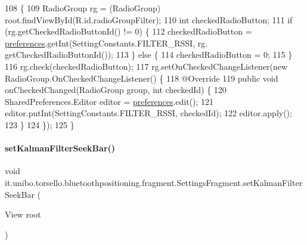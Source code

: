 \begin{DoxyCode}
108                                          \{
109         RadioGroup rg = (RadioGroup) root.findViewById(R.id.radioGroupFilter);
110         \textcolor{keywordtype}{int} checkedRadioButton;
111         \textcolor{keywordflow}{if} (rg.getCheckedRadioButtonId() != 0) \{
112             checkedRadioButton = \hyperlink{classit_1_1unibo_1_1torsello_1_1bluetoothpositioning_1_1fragment_1_1SettingsFragment_a52480c4d5d81ca59fe4a98ae3c623ea4_a52480c4d5d81ca59fe4a98ae3c623ea4}{preferences}.getInt(SettingConstants.FILTER\_RSSI, rg.
      getCheckedRadioButtonId());
113         \} \textcolor{keywordflow}{else} \{
114             checkedRadioButton = 0;
115         \}
116         rg.check(checkedRadioButton);
117         rg.setOnCheckedChangeListener(\textcolor{keyword}{new} RadioGroup.OnCheckedChangeListener() \{
118             @Override
119             \textcolor{keyword}{public} \textcolor{keywordtype}{void} onCheckedChanged(RadioGroup group, \textcolor{keywordtype}{int} checkedId) \{
120                 SharedPreferences.Editor editor = \hyperlink{classit_1_1unibo_1_1torsello_1_1bluetoothpositioning_1_1fragment_1_1SettingsFragment_a52480c4d5d81ca59fe4a98ae3c623ea4_a52480c4d5d81ca59fe4a98ae3c623ea4}{preferences}.edit();
121                 editor.putInt(SettingConstants.FILTER\_RSSI, checkedId);
122                 editor.apply();
123             \}
124         \});
125     \}
\end{DoxyCode}
\hypertarget{classit_1_1unibo_1_1torsello_1_1bluetoothpositioning_1_1fragment_1_1SettingsFragment_a84057f1633708ec85de5968ed9e7f032_a84057f1633708ec85de5968ed9e7f032}{}\label{classit_1_1unibo_1_1torsello_1_1bluetoothpositioning_1_1fragment_1_1SettingsFragment_a84057f1633708ec85de5968ed9e7f032_a84057f1633708ec85de5968ed9e7f032} 
\paragraph{\texorpdfstring{set\+Kalman\+Filter\+Seek\+Bar()}{setKalmanFilterSeekBar()}}
{\footnotesize\ttfamily void it.\+unibo.\+torsello.\+bluetoothpositioning.\+fragment.\+Settings\+Fragment.\+set\+Kalman\+Filter\+Seek\+Bar (\begin{DoxyParamCaption}\item[{View}]{root }\end{DoxyParamCaption})\hspace{0.3cm}{\ttfamily [private]}}


